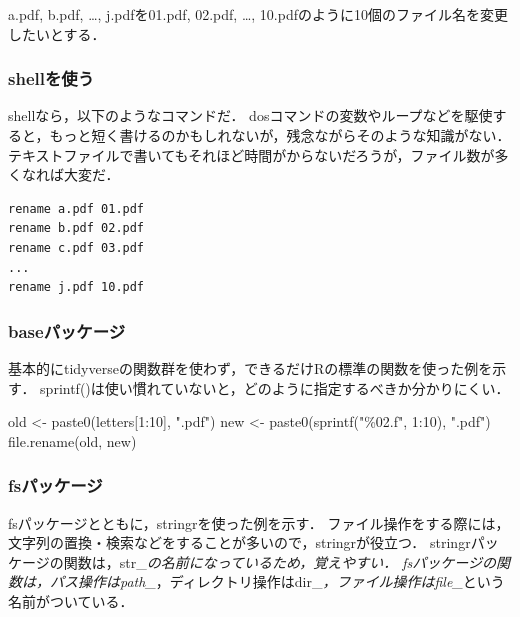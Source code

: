 \documentclass[
]{article}
\newenvironment{Shaded}{\begin{snugshade}}{\end{snugshade}}
\newcommand{\DecValTok}[1]{\textcolor[rgb]{0.00,0.00,0.81}{#1}}
\newcommand{\FunctionTok}[1]{\textcolor[rgb]{0.00,0.00,0.00}{#1}}
\newcommand{\NormalTok}[1]{#1}
\newcommand{\OtherTok}[1]{\textcolor[rgb]{0.56,0.35,0.01}{#1}}
\newcommand{\SpecialCharTok}[1]{\textcolor[rgb]{0.00,0.00,0.00}{#1}}
\newcommand{\StringTok}[1]{\textcolor[rgb]{0.31,0.60,0.02}{#1}}
\begin{document}
a.pdf, b.pdf, \ldots, j.pdfを01.pdf, 02.pdf, \ldots, 10.pdfのように10個のファイル名を変更したいとする．

\hypertarget{shellux3092ux4f7fux3046}{%
\subsubsection{shellを使う}\label{shellux3092ux4f7fux3046}}

shellなら，以下のようなコマンドだ．
dosコマンドの変数やループなどを駆使すると，もっと短く書けるのかもしれないが，残念ながらそのような知識がない．
テキストファイルで書いてもそれほど時間がからないだろうが，ファイル数が多くなれば大変だ．

\begin{verbatim}
rename a.pdf 01.pdf
rename b.pdf 02.pdf
rename c.pdf 03.pdf
...
rename j.pdf 10.pdf
\end{verbatim}

\hypertarget{baseux30d1ux30c3ux30b1ux30fcux30b8}{%
\subsubsection{baseパッケージ}\label{baseux30d1ux30c3ux30b1ux30fcux30b8}}

基本的にtidyverseの関数群を使わず，できるだけRの標準の関数を使った例を示す．
sprintf()は使い慣れていないと，どのように指定するべきか分かりにくい．

\begin{Shaded}
\begin{Highlighting}[]
\NormalTok{old }\OtherTok{\textless{}{-}} \FunctionTok{paste0}\NormalTok{(letters[}\DecValTok{1}\SpecialCharTok{:}\DecValTok{10}\NormalTok{], }\StringTok{".pdf"}\NormalTok{)}
\NormalTok{new }\OtherTok{\textless{}{-}} \FunctionTok{paste0}\NormalTok{(}\FunctionTok{sprintf}\NormalTok{(}\StringTok{"\%02.f"}\NormalTok{, }\DecValTok{1}\SpecialCharTok{:}\DecValTok{10}\NormalTok{), }\StringTok{".pdf"}\NormalTok{)}
\FunctionTok{file.rename}\NormalTok{(old, new)}
\end{Highlighting}
\end{Shaded}

\hypertarget{fsux30d1ux30c3ux30b1ux30fcux30b8}{%
\subsubsection{fsパッケージ}\label{fsux30d1ux30c3ux30b1ux30fcux30b8}}

fsパッケージとともに，stringrを使った例を示す．
ファイル操作をする際には，文字列の置換・検索などをすることが多いので，stringrが役立つ．
stringrパッケージの関数は，str\_\emph{の名前になっているため，覚えやすい．
fsパッケージの関数は，パス操作はpath\_}，ディレクトリ操作はdir\_\emph{，ファイル操作はfile\_}という名前がついている．
\end{document}

